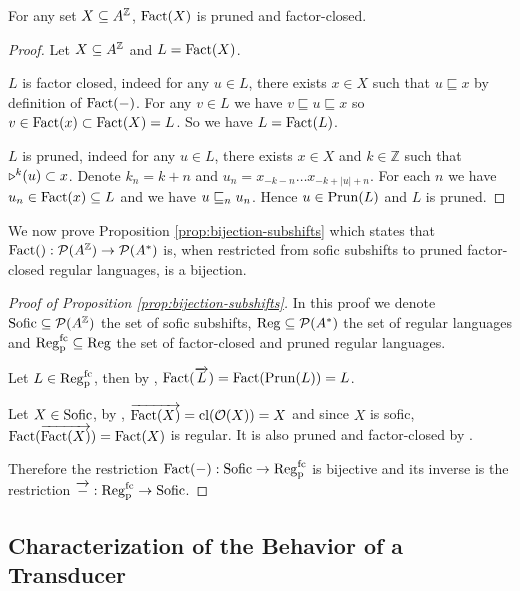 \begin{lemma}
  \label{lemma:fact-is-pfc}
  For any set $X \subseteq A^{\mathbb{Z}}$, $\mathrm{Fact}(X)$ is pruned and factor-closed.
\end{lemma}
\begin{proof}
  Let $X\subseteq A^{\mathbb{Z}}$ and $L=\mathrm{Fact}(X)$.

  $L$ is factor closed, indeed for any $u\in L$, there exists $x\in X$ such that $u\sqsubseteq x$ by definition of $\mathrm{Fact}(-)$. For any $v\in L$ we have $v\sqsubseteq u \sqsubseteq x$ so $v\in \mathrm{Fact}(x) \subset \mathrm{Fact}(X)=L$.
  So we have $L=\mathrm{Fact}(L)$.
  
  $L$ is pruned, indeed for any $u\in L$, there exists $x\in X$ and $k\in \mathbb{Z}$ such that $\shift{k}{}(u) \subset x$.
  Denote $k_n = k+n$ and $u_n = x_{-k-n}\dots x_{-k+|u|+n}$.
  For each $n$ we have $u_n\in \mathrm{Fact}(x)\subseteq L$ and we have $u\sqsubseteq_{n}u_n$. Hence $u\in \mathrm{Prun}(L)$ and $L$ is pruned.
\end{proof}


We now prove Proposition \ref{prop:bijection-subshifts} which states that $\mathrm{Fact}():{\mathcal{P}}(A^{\mathbb{Z}}) \to {\mathcal{P}}(A^*)$ is, when restricted from sofic subshifts to pruned factor-closed regular languages, is a bijection.

\begin{proof}[Proof of Proposition \ref{prop:bijection-subshifts}]
  In this proof we denote $\mathrm{Sofic}\subseteq {\mathcal{P}}(A^{\mathbb{Z}})$ the set of sofic subshifts, $\mathrm{Reg}\subseteq {\mathcal{P}}(A^*)$ the set of regular languages and $\mathrm{Reg}^\mathrm{fc}_\mathrm{p}\subseteq \mathrm{Reg}$ the set of factor-closed and pruned regular languages.

  Let $L\in\mathrm{Reg}^\mathrm{fc}_\mathrm{p}$, then by , $\mathrm{Fact}(\overrightarrow{L}) = \mathrm{Fact}(\mathrm{Prun}(L)) = L$.

  Let $X\in\mathrm{Sofic}$, by , $\overrightarrow{\mathrm{Fact}(X)} = \mathrm{cl}(\mathcal{O}(X)) = X$ and since $X$ is sofic, $\mathrm{Fact}(\overrightarrow{\mathrm{Fact}(X)}) = \mathrm{Fact}(X)$ is regular. It is also pruned and factor-closed by .

  Therefore the restriction $\mathrm{Fact}(-) : \mathrm{Sofic} \to \mathrm{Reg}^\mathrm{fc}_\mathrm{p}$ is bijective and its inverse is the restriction $\overrightarrow{-} : \mathrm{Reg}^\mathrm{fc}_\mathrm{p} \to \mathrm{Sofic}$.
\end{proof}



\subsection{Characterization of the Behavior of a Transducer}\label{app:transducer-behavior}

